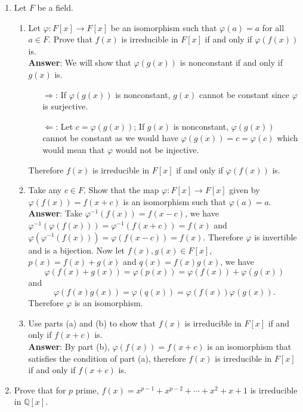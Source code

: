 \documentclass{article}
\begin{document}
\begin{enumerate}
      \item Let $F$ be a field.
            \begin{enumerate}
                  \item Let $\varphi:F[x]\rightarrow F[x]$ be an isomorphism such that $\varphi(a)=a$ for all $a\in F$. Prove that $f(x)$ is irreducible in $F[x]$ if and only if $\varphi(f(x))$ is.\\
                        \textbf{Answer}: We will show that $\varphi(g(x))$ is nonconstant if and only if $g(x)$ is.
                        \begin{itemize}
                              \item [$\Rightarrow$:] If $\varphi(g(x))$ is nonconstant, $g(x)$ cannot be constant since $\varphi$ is surjective.
                              \item [$\Leftarrow$:] Let $c=\varphi(g(x))$; If $g(x)$ is nonconstant, $\varphi(g(x))$ cannot be constant as we would have $\varphi(g(x))=c=\varphi(c)$ which would mean that $\varphi$ would not be injective.
                        \end{itemize}
                        Therefore $f(x)$ is irreducible in $F[x]$ if and only if $\varphi(f(x))$ is.
                  \item Take any $c\in F$. Show that the map $\varphi:F[x]\rightarrow F[x]$ given by $\varphi(f(x))=f(x+c)$ is an isomorphism such that $\varphi(a)=a$.\\
                  \textbf{Answer}: Take $\varphi^{-1}(f(x))=f(x-c)$, we have $\varphi^{-1}(\varphi(f(x)))=\varphi^{-1}(f(x+c))=f(x)$ and $\varphi(\varphi^{-1}(f(x)))=\varphi(f(x-c))=f(x)$. Therefore $\varphi$ is invertible and is a bijection. Now let $f(x),g(x)\in F[x]$, $p(x)=f(x)+g(x)$ and $q(x)=f(x)g(x)$, we have \[\varphi(f(x)+g(x))=\varphi(p(x))=\varphi(f(x))+\varphi(g(x))\] and \[\varphi(f(x)g(x))=\varphi(q(x))=\varphi(f(x))\varphi(g(x)).\] Therefore $\varphi$ is an isomorphism.
                  \item Use parts (a) and (b) to show that $f(x)$ is irreducible in $F[x]$ if and only if $f(x+c)$ is.\\
                  \textbf{Answer}: By part (b), $\varphi(f(x))=f(x+c)$ is an isomorphism that satisfies the condition of part (a), therefore $f(x)$ is irreducible in $F[x]$ if and only if $f(x+c)$ is.
            \end{enumerate}
      \item Prove that for $p$ prime, $f(x)=x^{p-1}+x^{p-2}+\cdots+x^2+x+1$ is irreducible in $\mathbb{Q}[x]$.\\

\end{enumerate}
\end{document}

